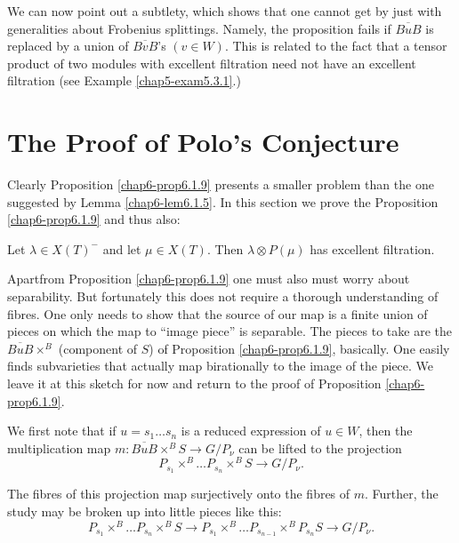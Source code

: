 \begin{remark}\label{chap6-rem6.1.10}
We can now point out a subtlety, which shows that one cannot get by
just with generalities about Frobenius splittings. Namely, the
proposition fails if $\overline{BuB}$ is replaced by a union of
$\overline{BvB}$'s $(v\in W)$. This is related to the fact that a
tensor product of two modules with excellent filtration need not have
an excellent filtration (see Example \ref{chap5-exam5.3.1}.)
\end{remark}

\section{The Proof of Polo's Conjecture}\label{chap6-sec6.2}

Clearly Proposition \ref{chap6-prop6.1.9} presents a smaller problem
than the one suggested by Lemma \ref{chap6-lem6.1.5}. In this section
we prove the Proposition \ref{chap6-prop6.1.9} and thus also:

\begin{theorem}\label{chap6-thm6.2.1}
Let $\lambda\in X(T)^{-}$ and let $\mu\in X(T)$. Then $\lambda\otimes
P(\mu)$ has excellent filtration.
\end{theorem}

Apart\pageoriginale from\label{page62} Proposition \ref{chap6-prop6.1.9} one must
also must worry about separability. But fortunately this does not
require a thorough understanding of fibres. One only needs to show that
the source of our map is a finite union of pieces on which the map to
``image piece'' is separable. The pieces to take are the
$\overline{BuB}\times^{B}$ (component of $S$) of Proposition
\ref{chap6-prop6.1.9}, basically. One easily finds subvarieties that
actually map birationally to the image of the piece. We leave it at
this sketch for now and return to the proof of Proposition
\ref{chap6-prop6.1.9}. 

We first note that if $u=s_{1}\ldots s_{n}$ is a reduced expression of
$u\in W$, then the multiplication map $m:\overline{BuB}\times^{B}S\to
G/P_{\nu}$ can be lifted to the projection
$$
P_{s_{1}}\times^{B}\ldots P_{s_{n}}\times^{B}S\to G/P_{\nu}.
$$

The fibres of this projection map surjectively onto the fibres of
$m$. Further, the study may be broken up into little pieces like this:
$$
P_{s_{1}}\times^{B}\ldots P_{s_{n}}\times^{B}S\to
P_{s_{1}}\times^{B}\ldots P_{s_{n-1}}\times^{B}P_{s_{n}}S\to
G/P_{\nu}.
$$

